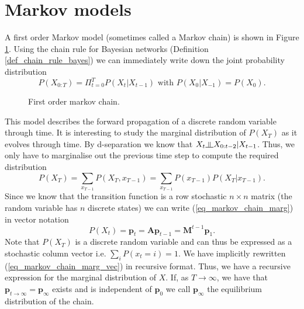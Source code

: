 \section{Markov models}
A first order Markov model (sometimes called a Markov chain) is shown in Figure \ref{fig_markov_chain}. Using the chain rule for Bayesian networks (Definition \ref{def_chain_rule_bayes}) we can immediately write down the joint probability distribution
\begin{equation}
P(X_{0:T}) = \Pi_{t=0}^T P(X_t|X_{t-1}) \text{ with } P(X_0|X_{-1}) = P(X_0).
\label{eq_markov_chain_joint}
\end{equation}  
\begin{figure}[H] 
\centering
{}
\caption{First order markov chain.}
\label{fig_markov_chain}
\end{figure}
This model describes the forward propagation of a discrete random variable through time. It is interesting to study the marginal distribution of $P(X_T)$ as it evolves through time. By d-separation we know that $X_t \indep X_{0:t-2} | X_{t-1}$. Thus, we only have to marginalise out the previous time step to compute the required distribution 
\begin{equation}
P(X_T) = \sum_{x_{T-1}} P(X_T, x_{T-1}) = \sum_{x_{T-1}} P(x_{T-1})P(X_T|x_{T-1}).
\label{eq_markov_chain_marg}
\end{equation}
Since we know that the transition function is a row stochastic $n \times n$ matrix (the random variable has $n$ discrete states) we can write (\ref{eq_markov_chain_marg}) in vector notation 
\begin{equation}
P(X_t) = \mathbf{p}_t = \mathbf{A}\mathbf{p}_{t-1} = \mathbf{M}^{t-1}\mathbf{p}_1.
\label{eq_markov_chain_marg_vec}
\end{equation}
Note that $P(X_T)$ is a discrete random variable and can thus be expressed as a stochastic column vector i.e. $\sum_i P(x_t=i) = 1$. We have implicitly rewritten (\ref{eq_markov_chain_marg_vec}) in recursive format. Thus, we have a recursive expression for the marginal distribution of $X$. If, as $T \rightarrow \infty$, we have that $\mathbf{p}_{t \rightarrow \infty} = \mathbf{p}_{\infty}$ exists and is independent of $\mathbf{p}_0$ we call $\mathbf{p}_{\infty}$ the equilibrium distribution of the chain. 

